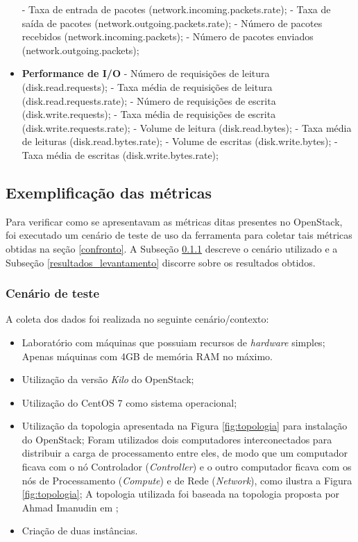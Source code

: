 \documentclass[conference]{IEEEtran}
\begin{document}
\begin{itemize}
    \subitem - Taxa de entrada de pacotes (network.incoming.packets.rate);
    \subitem - Taxa de saída de pacotes (network.outgoing.packets.rate);
    \subitem - Número de pacotes recebidos (network.incoming.packets);
    \subitem - Número de pacotes enviados (network.outgoing.packets);
  \item \textbf{Performance de I/O} 
    \subitem - Número de requisições de leitura (disk.read.requests);
    \subitem - Taxa média de requisições de leitura (disk.read.requests.rate);
    \subitem - Número de requisições de escrita (disk.write.requests);
    \subitem - Taxa média de requisições de escrita (disk.write.requests.rate);
    \subitem - Volume de leitura (disk.read.bytes);
    \subitem - Taxa média de leituras (disk.read.bytes.rate);
    \subitem - Volume de escritas (disk.write.bytes);
    \subitem - Taxa média de escritas (disk.write.bytes.rate);
 \end{itemize}  

  \subsection{Exemplificação das métricas} 
    Para verificar como se apresentavam as métricas ditas presentes no OpenStack, foi executado um cenário de teste de uso da ferramenta
    para coletar tais métricas obtidas na seção \ref{confronto}. 
    A Subseção \ref{cenario} descreve o cenário utilizado e a Subseção \ref{resultados_levantamento} discorre sobre os resultados obtidos.
  
    \subsubsection{\textbf{Cenário de teste}} \label{cenario}
	
	A coleta dos dados foi realizada no seguinte cenário/contexto:
	
	\begin{itemize}
	 \item Laboratório com máquinas que possuiam recursos de \textit{hardware} simples;
	    \subitem Apenas máquinas com 4GB de memória RAM no máximo.
	 \item Utilização da versão \textit{Kilo} do OpenStack;
	 \item Utilização do CentOS 7 \cite{centos} como sistema operacional;
	 \item Utilização da topologia apresentada na Figura \ref{fig:topologia} para instalação do OpenStack;
	    \subitem Foram utilizados dois computadores interconectados para distribuir a carga de processamento entre eles, 
		  de modo que um computador ficava com o nó Controlador (\textit{Controller}) e o outro computador ficava
		     com os nós de Processamento (\textit{Compute}) e de Rede (\textit{Network}), como ilustra a Figura \ref{fig:topologia};
	    \subitem A topologia utilizada foi baseada na topologia proposta por Ahmad Imanudin em \cite{imanudin};
	  \item Criação de duas instâncias.
	\end{itemize}
	
\end{document}
